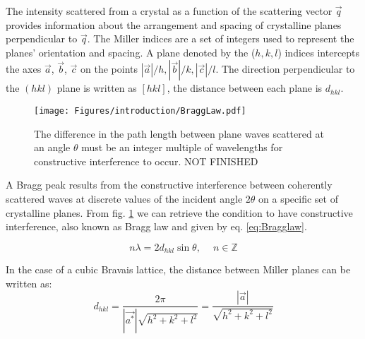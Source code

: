 The intensity scattered from a crystal as a function of the scattering vector $\vec{q}$ provides information about the arrangement and spacing of crystalline planes perpendicular to $\vec{q}$.
The Miller indices are a set of integers used to represent the planes' orientation and spacing.
A plane denoted by the ($h, k, l$) indices intercepts the axes $\vec{a}$, $\vec{b}$, $\vec{c}$ on the points $|\vec{a}|/h, |\vec{b}|/k, |\vec{c}|/l$.
The direction perpendicular to the $(hkl)$ plane is written as $[hkl]$, the distance between each plane is $d_{hkl}$.

\begin{figure}[!htb]
    \centering
    \texttt{[image: Figures/introduction/BraggLaw.pdf]}
    \caption{The difference in the path length between plane waves scattered at an angle $\theta$ must be an integer multiple of wavelengths for constructive interference to occur. NOT FINISHED}
    \label{fig:BraggLaw}
\end{figure}

A Bragg peak results from the constructive interference between coherently scattered waves at discrete values of the incident angle $2\theta$ on a specific set of crystalline planes.
From fig. \ref{fig:BraggLaw} we can retrieve the condition to have constructive interference, also known as Bragg law and given by eq. \eqref{eq:Bragglaw}.

\begin{equation}
    \label{eq:Bragglaw}
    n\lambda = 2d_{hkl} \sin{\theta}, \quad \ n \in \mathbb{Z}
\end{equation}


In the case of a cubic Bravais lattice, the distance between Miller planes can be written as:
\begin{equation}
    \label{eq:Interplanarspacing}
    d_{hkl}=\frac{2\pi}{|\vec{a^*}|\sqrt{h^2 + k^2 + l^2}}=\frac{|\vec{a}|}{\sqrt{h^2 + k^2 + l^2}}
\end{equation}

